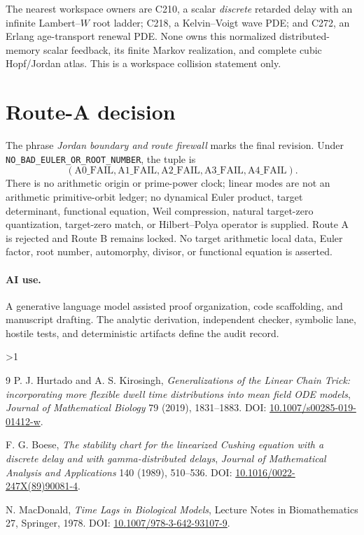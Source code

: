 \documentclass[9pt]{extarticle}
\providecommand{\CRevisionRound}{2}
\begin{document}
The nearest workspace owners are C210, a scalar \emph{discrete} retarded
delay with an infinite Lambert--$W$ root ladder; C218, a Kelvin--Voigt wave
PDE; and C272, an Erlang age-transport renewal PDE.  None owns this
normalized distributed-memory scalar feedback, its finite Markov
realization, and complete cubic Hopf/Jordan atlas.  This is a workspace
collision statement only.

\section{Route-A decision}
The phrase \emph{Jordan boundary and route firewall} marks the final
revision.  Under \texttt{NO\_BAD\_EULER\_OR\_ROOT\_NUMBER}, the tuple is
\[
 (\mathrm{A0\_FAIL},\mathrm{A1\_FAIL},\mathrm{A2\_FAIL},
  \mathrm{A3\_FAIL},\mathrm{A4\_FAIL}).
\]
There is no arithmetic origin or prime-power clock; linear modes are not an
arithmetic primitive-orbit ledger; no dynamical Euler product, target
determinant, functional equation, Weil compression, natural target-zero
quantization, target-zero match, or Hilbert--Polya operator is supplied.
Route A is rejected and Route B remains locked.  No target arithmetic local
data, Euler factor, root number, automorphy, divisor, or functional equation
is asserted.

\paragraph{AI use.}
A generative language model assisted proof organization, code scaffolding,
and manuscript drafting.  The analytic derivation, independent checker,
symbolic lane, hostile tests, and deterministic artifacts define the audit
record.
\fi

\ifnum\CRevisionRound>1
\begingroup
\small
\begin{thebibliography}{9}
P. J. Hurtado and A. S. Kirosingh,
\emph{Generalizations of the Linear Chain Trick: incorporating more
flexible dwell time distributions into mean field ODE models},
\emph{Journal of Mathematical Biology} 79 (2019), 1831--1883.
DOI: \href{https://doi.org/10.1007/s00285-019-01412-w}%
{10.1007/s00285-019-01412-w}.

F. G. Boese,
\emph{The stability chart for the linearized Cushing equation with a
discrete delay and with gamma-distributed delays},
\emph{Journal of Mathematical Analysis and Applications} 140 (1989),
510--536.
DOI: \href{https://doi.org/10.1016/0022-247X(89)90081-4}%
{10.1016/0022-247X(89)90081-4}.

N. MacDonald,
\emph{Time Lags in Biological Models},
Lecture Notes in Biomathematics 27, Springer, 1978.
DOI: \href{https://doi.org/10.1007/978-3-642-93107-9}%
{10.1007/978-3-642-93107-9}.
\end{thebibliography}
\endgroup
\fi
\end{document}
